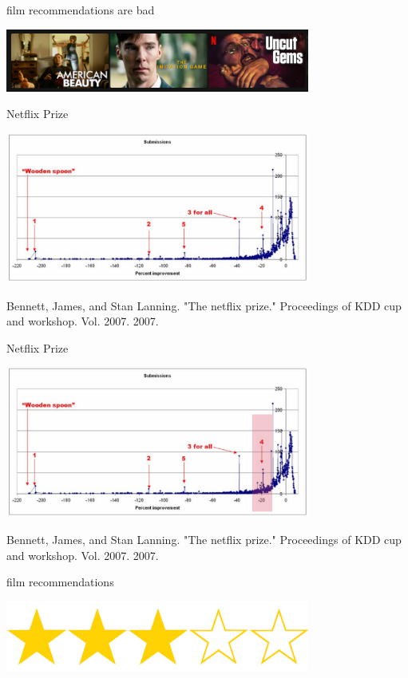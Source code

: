 \documentclass{beamer}
\begin{document}
\begin{frame}{film  recommendations are bad}
 \begin{center}
    \includegraphics[width=10cm]{netflix_recommends.png}
 \end{center}
 \end{frame}
\begin{frame}{Netflix Prize}
  \begin{center}
    \includegraphics[width=10cm]{netflix_prize.png}
  \end{center}
  \vfill
\tiny{Bennett, James, and Stan Lanning. "The netflix prize." Proceedings of KDD cup and workshop. Vol. 2007. 2007.}
\end{frame}
\begin{frame}{Netflix Prize}
  \begin{center}
    \includegraphics[width=10cm]{netflix_prize_1.png}
  \end{center}
  \vfill
\tiny{Bennett, James, and Stan Lanning. "The netflix prize." Proceedings of KDD cup and workshop. Vol. 2007. 2007.}
\end{frame}
\begin{frame}{film  recommendations}
  \begin{center}
    \includegraphics[width=10cm]{stars.png}
  \end{center}
\end{frame}
\end{document}

